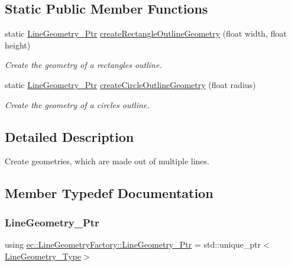 \subsection*{Static Public Member Functions}
\begin{DoxyCompactItemize}
\item 
static \mbox{\hyperlink{classec_1_1_line_geometry_factory_a8f7bd7480ebc0dbc77930d81dcb69678}{Line\+Geometry\+\_\+\+Ptr}} \mbox{\hyperlink{classec_1_1_line_geometry_factory_ad5a4cbba96cb7d6fa979e6266c7a8912}{create\+Rectangle\+Outline\+Geometry}} (float width, float height)
\begin{DoxyCompactList}\small\item\em Create the geometry of a rectangle\textquotesingle{}s outline. \end{DoxyCompactList}\item 
static \mbox{\hyperlink{classec_1_1_line_geometry_factory_a8f7bd7480ebc0dbc77930d81dcb69678}{Line\+Geometry\+\_\+\+Ptr}} \mbox{\hyperlink{classec_1_1_line_geometry_factory_a7546d1c1b7125a621f2e8a652035e843}{create\+Circle\+Outline\+Geometry}} (float radius)
\begin{DoxyCompactList}\small\item\em Create the geometry of a circle\textquotesingle{}s outline. \end{DoxyCompactList}\end{DoxyCompactItemize}


\subsection{Detailed Description}
Create geometries, which are made out of multiple lines. 

\subsection{Member Typedef Documentation}
\mbox{\label{classec_1_1_line_geometry_factory_a8f7bd7480ebc0dbc77930d81dcb69678}} 
\subsubsection{\texorpdfstring{Line\+Geometry\+\_\+\+Ptr}{LineGeometry\_Ptr}}
{\footnotesize\ttfamily using \mbox{\hyperlink{classec_1_1_line_geometry_factory_a8f7bd7480ebc0dbc77930d81dcb69678}{ec\+::\+Line\+Geometry\+Factory\+::\+Line\+Geometry\+\_\+\+Ptr}} =  std\+::unique\+\_\+ptr$<$\mbox{\hyperlink{classec_1_1_line_geometry_factory_a3025abbbb9ff132e43d46b17f1381213}{Line\+Geometry\+\_\+\+Type}}$>$}

